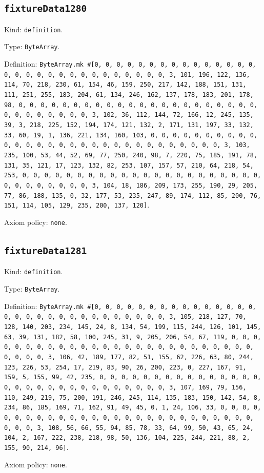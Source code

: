 \documentclass[11pt]{article}
\begin{document}
\subsection*{\texttt{fixtureData1280}}
\noindent Kind: \texttt{definition}.\par
\noindent Type: \texttt{ByteArray}.\par
\noindent Definition: \texttt{ByteArray.mk \#[0, 0, 0, 0, 0, 0, 0, 0, 0, 0, 0, 0, 0, 0, 0, 0, 0, 0, 0, 0, 0, 0, 0, 0, 0, 0, 0, 0, 0, 0, 3, 101, 196, 122, 136, 114, 70, 218, 230, 61, 154, 46, 159, 250, 217, 142, 188, 151, 131, 111, 251, 255, 183, 204, 61, 134, 246, 162, 137, 178, 183, 201, 178, 98, 0, 0, 0, 0, 0, 0, 0, 0, 0, 0, 0, 0, 0, 0, 0, 0, 0, 0, 0, 0, 0, 0, 0, 0, 0, 0, 0, 0, 0, 0, 3, 102, 36, 112, 144, 72, 166, 12, 245, 135, 39, 3, 218, 225, 152, 194, 174, 121, 132, 2, 171, 131, 197, 33, 132, 33, 60, 19, 1, 136, 221, 134, 160, 103, 0, 0, 0, 0, 0, 0, 0, 0, 0, 0, 0, 0, 0, 0, 0, 0, 0, 0, 0, 0, 0, 0, 0, 0, 0, 0, 0, 0, 0, 0, 3, 103, 235, 100, 53, 44, 52, 69, 77, 250, 240, 98, 7, 220, 75, 185, 191, 78, 131, 35, 121, 17, 123, 132, 82, 253, 107, 157, 57, 210, 64, 218, 54, 253, 0, 0, 0, 0, 0, 0, 0, 0, 0, 0, 0, 0, 0, 0, 0, 0, 0, 0, 0, 0, 0, 0, 0, 0, 0, 0, 0, 0, 0, 0, 3, 104, 18, 186, 209, 173, 255, 190, 29, 205, 77, 86, 188, 135, 0, 32, 177, 53, 235, 247, 89, 174, 112, 85, 200, 76, 151, 114, 105, 129, 235, 200, 137, 120]}.\par
\noindent Axiom policy: \texttt{none}.\par
\subsection*{\texttt{fixtureData1281}}
\noindent Kind: \texttt{definition}.\par
\noindent Type: \texttt{ByteArray}.\par
\noindent Definition: \texttt{ByteArray.mk \#[0, 0, 0, 0, 0, 0, 0, 0, 0, 0, 0, 0, 0, 0, 0, 0, 0, 0, 0, 0, 0, 0, 0, 0, 0, 0, 0, 0, 0, 0, 3, 105, 218, 127, 70, 128, 140, 203, 234, 145, 24, 8, 134, 54, 199, 115, 244, 126, 101, 145, 63, 39, 131, 182, 58, 100, 245, 31, 9, 205, 206, 54, 67, 119, 0, 0, 0, 0, 0, 0, 0, 0, 0, 0, 0, 0, 0, 0, 0, 0, 0, 0, 0, 0, 0, 0, 0, 0, 0, 0, 0, 0, 0, 0, 3, 106, 42, 189, 177, 82, 51, 155, 62, 226, 63, 80, 244, 123, 226, 53, 254, 17, 219, 83, 90, 26, 200, 223, 0, 227, 167, 91, 159, 5, 155, 99, 42, 235, 0, 0, 0, 0, 0, 0, 0, 0, 0, 0, 0, 0, 0, 0, 0, 0, 0, 0, 0, 0, 0, 0, 0, 0, 0, 0, 0, 0, 0, 0, 3, 107, 169, 79, 156, 110, 249, 219, 75, 200, 191, 246, 245, 114, 135, 183, 150, 142, 54, 8, 234, 86, 185, 169, 71, 162, 91, 49, 45, 0, 1, 24, 106, 33, 0, 0, 0, 0, 0, 0, 0, 0, 0, 0, 0, 0, 0, 0, 0, 0, 0, 0, 0, 0, 0, 0, 0, 0, 0, 0, 0, 0, 0, 0, 3, 108, 56, 66, 55, 94, 85, 78, 33, 64, 99, 50, 43, 65, 24, 104, 2, 167, 222, 238, 218, 98, 50, 136, 104, 225, 244, 221, 88, 2, 155, 90, 214, 96]}.\par
\noindent Axiom policy: \texttt{none}.\par
\end{document}
